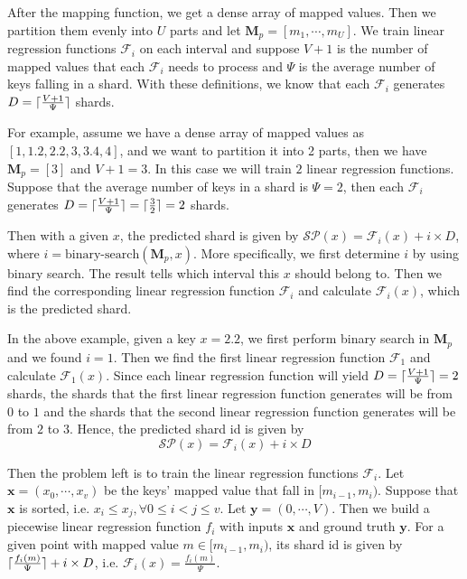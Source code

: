 After the mapping function, we get a dense array of mapped values. Then we partition them evenly into $U$ parts and let $\boldsymbol{M}_p=[m_1,\cdots, m_U]$. We train linear regression functions $\mathcal{F}_i$ on each interval and suppose $V+1$ is the number of mapped values that each $\mathcal{F}_i$ needs to process and $\Psi$ is the average number of keys falling in a shard. With these definitions, we know that each $\mathcal{F}_i$ generates $D=\lceil\frac{V+1}{\Psi}\rceil$ shards.

\begin{mscexample}
	For example, assume we have a dense array of mapped values as $[1,1.2,2.2,3,3.4,4]$, and we want to partition it into 2 parts, then we have $\boldsymbol{M}_p=[3]$ and $V+1=3$. In this case we will train $2$ linear regression functions. Suppose that the average number of keys in a shard is $\Psi=2$, then each $\mathcal{F}_i$ generates $D=\lceil\frac{V+1}{\Psi}\rceil=\lceil\frac{3}{2}\rceil=2$ shards.
\end{mscexample}


Then with a given $x$, the predicted shard is given by $\mathcal{SP}(x)=\mathcal{F}_i(x)+i\times D$, where $i=\text{binary-search}(\boldsymbol{M}_p,x)$. More specifically, we first determine $i$ by using binary search. The result tells which interval this $x$ should belong to. Then we find the corresponding linear regression function $\mathcal{F}_i$ and calculate $\mathcal{F}_i(x)$, which is the predicted shard.

\begin{mscexample}
	In the above example, given a key $x=2.2$, we first perform binary search in $\boldsymbol{M}_p$ and we found $i=1$. Then we find the first linear regression function $\mathcal{F}_1$ and calculate $\mathcal{F}_1(x)$. Since each linear regression function will yield $D=\lceil\frac{V+1}{\Psi}\rceil=2$ shards, the shards that the first linear regression function generates will be from $0$ to $1$ and the shards that the second linear regression function generates will be from $2$ to $3$. Hence, the predicted shard id is given by 
$$
\mathcal{SP}(x)=\mathcal{F}_i(x)+i\times D
$$
\end{mscexample}

Then the problem left is to train the linear regression functions $\mathcal{F}_i$. Let $\boldsymbol{x}=(x_0,\cdots,x_v)$ be the keys' mapped value that fall in $[m_{i-1}, m_i)$. Suppose that $\boldsymbol{x}$ is sorted, i.e. $x_i\leq x_j, \forall 0\leq i<j\leq v$. Let $\boldsymbol{y}=(0,\cdots, V)$. Then we build a piecewise linear regression function $f_i$ with inputs $\boldsymbol{x}$ and ground truth $\boldsymbol{y}$. For a given point with mapped value $m\in[m_{i-1}, m_i)$, its shard id is given by $\lceil\frac{f_i(m)}{\Psi}\rceil+i\times D$, i.e. $\mathcal{F}_i(x)=\frac{f_i(m)}{\Psi}$.

